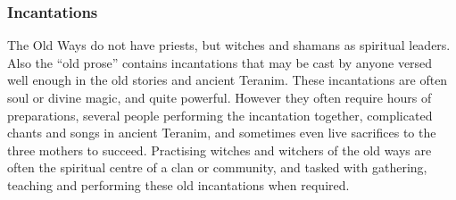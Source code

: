 \subsubsection{Incantations}

The Old Ways do not have priests, but witches and shamans as spiritual
leaders. Also the ``old prose'' contains incantations that may be cast by
anyone versed well enough in the old stories and ancient Teranim. These
incantations are often soul or divine magic, and quite powerful. However they
often require hours of preparations, several people performing the incantation
together, complicated chants and songs in ancient Teranim, and sometimes even
live sacrifices to the three mothers to succeed. Practising witches and
witchers of the old ways are often the spiritual centre of a clan or
community, and tasked with gathering, teaching and performing these old
incantations when required.
